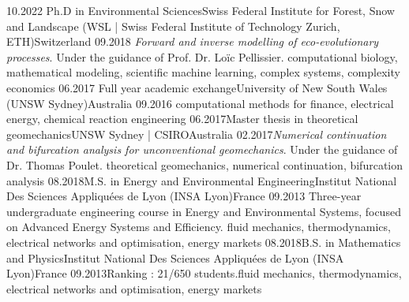 \begin{experiences}
    \experience
      {10.2022}   {Ph.D in Environmental Sciences}{Swiss Federal Institute for Forest, Snow and Landscape (WSL | Swiss Federal Institute of Technology Zurich, ETH)}{Switzerland}
      {09.2018} {\textit{Forward and inverse modelling of eco-evolutionary processes}.
                      Under the guidance of Prof. Dr. Loïc Pellissier.
                      }
                      {computational biology, mathematical modeling, scientific machine learning, complex systems, complexity economics}
    \emptySeparator
    \experienceshort
      {06.2017} {Full year academic exchange}{University of New South Wales (UNSW Sydney)}{Australia}
      {09.2016} {computational methods for finance, electrical energy, chemical reaction engineering}
    \emptySeparator
    \experience
      {06.2017}{Master thesis in theoretical geomechanics}{UNSW Sydney | CSIRO}{Australia}
      {02.2017}{\textit{Numerical continuation and bifurcation analysis for unconventional geomechanics}. Under the guidance of Dr. Thomas Poulet.
                      }
                      {theoretical geomechanics, numerical continuation, bifurcation analysis}
    \emptySeparator
    \experience
    {08.2018}{M.S. in Energy and Environmental Engineering}{Institut National Des Sciences Appliquées de Lyon (INSA Lyon)}{France}
    {09.2013} {Three-year undergraduate engineering course in Energy and Environmental Systems, focused on Advanced Energy Systems and Efficiency.
    }{fluid mechanics, thermodynamics, electrical networks and optimisation, energy markets}
    \emptySeparator
    \experience
    {08.2018}{B.S. in Mathematics and Physics}{Institut National Des Sciences Appliquées de Lyon (INSA Lyon)}{France}
    {09.2013}{Ranking : 21/650 students.}{fluid mechanics, thermodynamics, electrical networks and optimisation, energy markets}
  \end{experiences}

